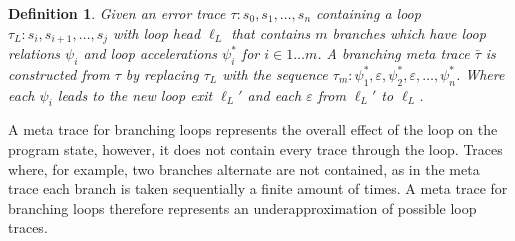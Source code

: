 \documentclass{article}
\newtheorem{mydef}{Definition}
\begin{document}
\begin{mydef}
	Given an error trace $\tau: s_0, s_1, \ldots, s_n$ containing a loop $\tau_L: s_i, s_{i+1}, \ldots, s_j$ with loop head $\ell_L$ that contains $m$ branches which have loop relations $\psi_i$ and loop accelerations $\psi_i^*$ for $i \in 1 \ldots m$. A branching meta trace $\bar{\tau}$ is constructed from $\tau$ by replacing $\tau_L$ with the sequence $\tau_m: \psi_1^*, \varepsilon, \psi_2^*, \varepsilon, \ldots, \psi_n^* $. Where each $\psi_i$ leads to the new loop exit $\ell_L'$ and each $\varepsilon$ from $\ell_L'$ to $\ell_L$.
\end{mydef}
 A meta trace for branching loops represents the overall effect of the loop on the program state, however, it does not contain every trace through the loop. Traces where, for example, two branches alternate are not contained, as in the meta trace each branch is taken sequentially a finite amount of times. A meta trace for branching loops therefore represents an underapproximation of possible loop traces. \\ \par
\end{document}
